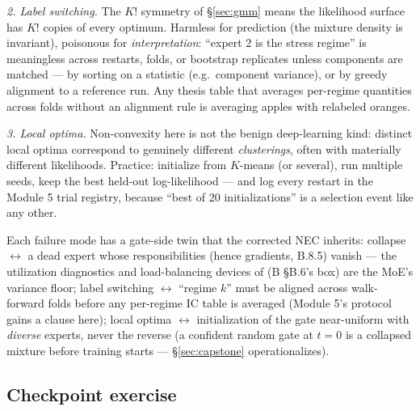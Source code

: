 \documentclass[11pt]{article}
\numberwithin{equation}{section}
\theoremstyle{plain}
\theoremstyle{definition}
\theoremstyle{remark}
\newcounter{exercise}
\begin{document}
\emph{2. Label switching.} The $K!$ symmetry of \S\ref{sec:gmm} means the likelihood surface has $K!$ copies of every optimum. Harmless for prediction (the mixture density is invariant), poisonous for \emph{interpretation}: ``expert 2 is the stress regime'' is meaningless across restarts, folds, or bootstrap replicates unless components are matched --- by sorting on a statistic (e.g.\ component variance), or by greedy alignment to a reference run. Any thesis table that averages per-regime quantities across folds without an alignment rule is averaging apples with relabeled oranges.

\emph{3. Local optima.} Non-convexity here is not the benign deep-learning kind: distinct local optima correspond to genuinely different \emph{clusterings}, often with materially different likelihoods. Practice: initialize from $K$-means (or several), run multiple seeds, keep the best held-out log-likelihood --- and log every restart in the Module 5 trial registry, because ``best of 20 initializations'' is a selection event like any other.

\begin{necbox}
Each failure mode has a gate-side twin that the corrected NEC inherits: collapse $\leftrightarrow$ a dead expert whose responsibilities (hence gradients, B.8.5) vanish --- the utilization diagnostics and load-balancing devices of (B \S B.6's box) are the MoE's variance floor; label switching $\leftrightarrow$ ``regime $k$'' must be aligned across walk-forward folds before any per-regime IC table is averaged (Module 5's protocol gains a clause here); local optima $\leftrightarrow$ initialization of the gate near-uniform with \emph{diverse} experts, never the reverse (a confident random gate at $t=0$ is a collapsed mixture before training starts --- \S\ref{sec:capstone} operationalizes).
\end{necbox}


\subsection*{Checkpoint exercise}
\end{document}
